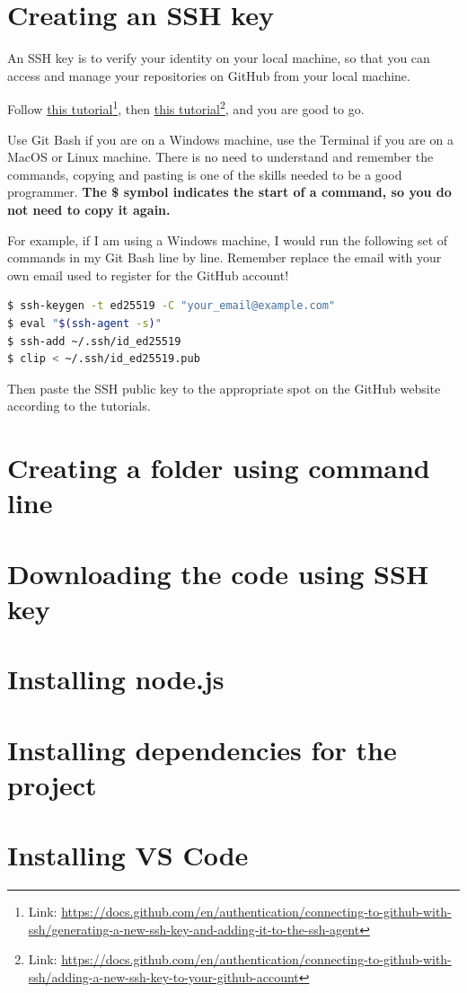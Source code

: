 \section{Creating an SSH key}

An SSH key is to verify your identity on your local machine, so that you can access and manage your repositories on GitHub from your local machine.

Follow \href{https://docs.github.com/en/authentication/connecting-to-github-with-ssh/generating-a-new-ssh-key-and-adding-it-to-the-ssh-agent}{this tutorial}\footnote{Link: \href{https://docs.github.com/en/authentication/connecting-to-github-with-ssh/generating-a-new-ssh-key-and-adding-it-to-the-ssh-agent}{https://docs.github.com/en/authentication/connecting-to-github-with-ssh/generating-a-new-ssh-key-and-adding-it-to-the-ssh-agent}}, then \href{https://docs.github.com/en/authentication/connecting-to-github-with-ssh/adding-a-new-ssh-key-to-your-github-account}{this tutorial}\footnote{Link: \href{https://docs.github.com/en/authentication/connecting-to-github-with-ssh/adding-a-new-ssh-key-to-your-github-account}{https://docs.github.com/en/authentication/connecting-to-github-with-ssh/adding-a-new-ssh-key-to-your-github-account}}, and you are good to go. 
\vspace{6mm}

Use Git Bash if you are on a Windows machine, use the Terminal if you are on a MacOS or Linux machine. There is no need to understand and remember the commands, copying and pasting is one of the skills needed to be a good programmer. \textbf{The \$ symbol indicates the start of a command, so you do not need to copy it again.}
\vspace{6mm}

For example, if I am using a Windows machine, I would run the following set of commands in my Git Bash line by line. Remember replace the email with your own email used to register for the GitHub account!

\begin{lstlisting}[language=bash]
$ ssh-keygen -t ed25519 -C "your_email@example.com"
$ eval "$(ssh-agent -s)"
$ ssh-add ~/.ssh/id_ed25519
$ clip < ~/.ssh/id_ed25519.pub
\end{lstlisting}

Then paste the SSH public key to the appropriate spot on the GitHub website according to the tutorials.

\section{Creating a folder using command line}

\section{Downloading the code using SSH key}

\section{Installing node.js}

\section{Installing dependencies for the project}

\section{Installing VS Code}